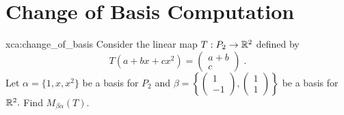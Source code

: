 \section{Change of Basis Computation}

\begin{xca}{xca:change_of_basis}
Consider the linear map $T: P_2 \rightarrow \mathbb R^2$ defined by
$$T(a+bx+cx^2) = \begin{pmatrix} a+b \\ c\end{pmatrix}\;.$$
Let $\alpha = \{1,x,x^2\}$ be a basis for $P_2$ and $\beta = \left\{\begin{pmatrix} 1 \\ -1\end{pmatrix}, \begin{pmatrix} 1 \\ 1\end{pmatrix} \right\}$ be a basis for $\mathbb R^2.$ Find $M_{\beta\alpha}(T).$
\end{xca}

